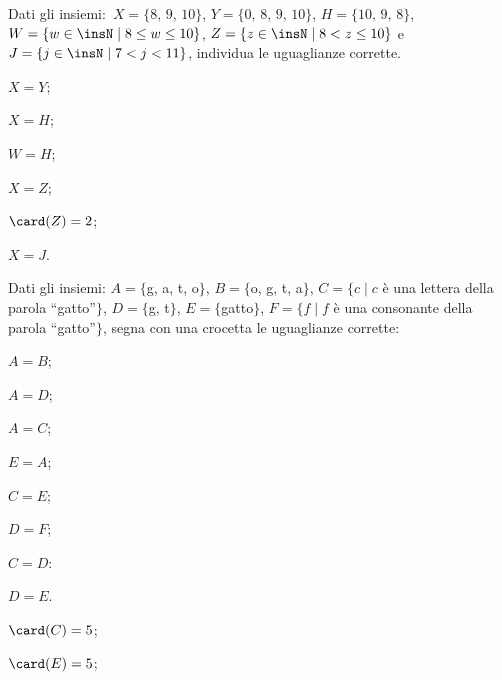 \begin{esercizio}
\label{ese:\thechapter.37}
Dati gli insiemi:~$X=\{\text{8, 9, 10}\}$, $Y=\{\text{0, 8, 9, 10}\}$, $H=\{\text{10, 9, 8}\}$,
$W=\{w\in\insN\mid 8\le w\le 10\}$, $Z=\{z\in\insN\mid 8<z\le 10\}$ e~$J=\{j\in\insN\mid 7<j<11\}$,
individua le uguaglianze corrette.
\begin{multicols}{3}
\begin{enumeratea}
\item $X = Y$;
\item $X= H$;
\item $W = H$;
\item $X = Z$;
\item $\card (Z)=2$;
\item $X = J$.
\end{enumeratea}
\end{multicols}
\end{esercizio}

\begin{esercizio}
\label{ese:\thechapter.38}
Dati gli insiemi:
$A=\{$g, a, t, o$\}$, $B=\{$o, g, t, a$\}$, $C=\{c\mid c$ è una lettera della parola ``gatto''$\}$,
$D=\{$g, t$\}$, $E=\{$gatto$\}$, $F=\{f\mid f$ è una consonante della parola ``gatto''$\}$,
segna con una crocetta le uguaglianze corrette:
\begin{multicols}{4}
\begin{enumeratea}
 \item $A = B$;
 \item $A = D$;
 \item $A = C$;
 \item $E = A$;
 \item $C = E$;
 \item $D = F$;
 \item $C = D$:
 \item $D = E$.
 \columnbreak
 \item $\card (C)=5$;
 \item $\card (E)=5$;
\end{enumeratea}
\end{multicols}
\end{esercizio}

